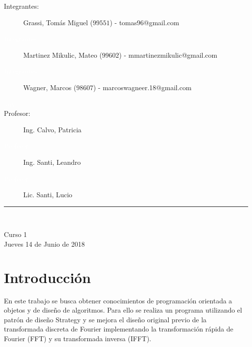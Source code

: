 \documentclass[12pt,a4paper]{report}
\begin{document}
\begin{titlepage}
\begin{center}
			\begin{large}
				\begin{description}
					\item[\hspace{0.15 cm}Integrantes:]
						Grassi, Tomás Miguel ($99551$) - tomas96@gmail.com 					
					\item[\hspace{0.15 cm}\textcolor{white}{Integrantes:}]
						Martinez Mikulic, Mateo ($99602$) - mmartinezmikulic@gmail.com
					\item[\hspace{0.15 cm}\textcolor{white}{Integrantes:}]
						Wagner, Marcos ($98607$) - marcoswagneer.18@gmail.com
					\item[\hspace{1.4 cm}\textcolor{white}{aux}]
					\item[\hspace{0.10 cm}Profesor:]
						Ing. Calvo, Patricia
					\item[\hspace{0.10 cm}\textcolor{white}{Profesor:}]	
						Ing. Santi, Leandro
					\item[\hspace{0.10 cm}\textcolor{white}{Profesor:}]	
						Lic. Santi, Lucio
				\end{description}
			\end{large}
			
		
		\vspace*{0.8 cm}
	
		\rule{80mm}{0.1mm}\\
	
		\vspace*{0.1in}
	
			\begin{large}
				Curso 1 \\
				Jueves 14 de Junio de 2018 \\
			\end{large}
		
	\end{center}

\end{titlepage}		

	\section{Introducción}	
		
		\indent En este trabajo se busca obtener conocimientos de programación orientada a objetos y de diseño de algoritmos. Para ello se
		realiza un programa utilizando el patrón de diseño Strategy y se mejora el diseño original previo de la transformada discreta de Fourier
		implementando la transformación rápida de Fourier (FFT) y su transformada inversa (IFFT).
		
\end{document}
